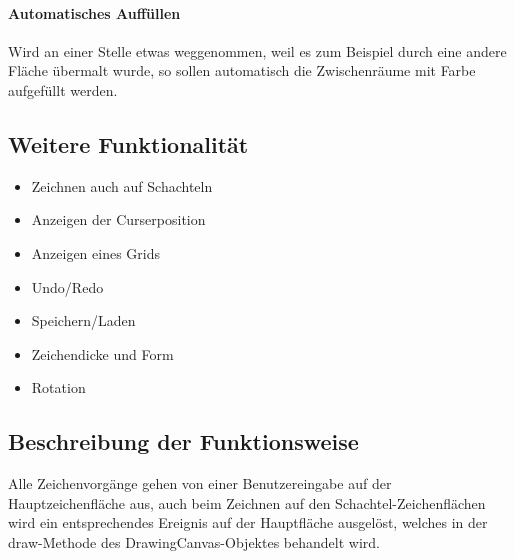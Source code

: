 \paragraph{Automatisches Auffüllen}
Wird an einer Stelle etwas weggenommen, weil es zum Beispiel durch eine andere Fläche übermalt wurde, so sollen automatisch die Zwischenräume mit Farbe aufgefüllt werden.

\subsection{Weitere Funktionalität}
\label{subsec:weiteres}

\begin{itemize}
  \item Zeichnen auch auf Schachteln
  \item Anzeigen der Curserposition
  \item Anzeigen eines Grids
  \item Undo/Redo
  \item Speichern/Laden
  \item Zeichendicke und Form
  \item Rotation
\end{itemize}

\subsection{Beschreibung der Funktionsweise}
\label{subsec:funktionsweise}

Alle Zeichenvorgänge gehen von einer Benutzereingabe auf der Hauptzeichenfläche aus, auch beim Zeichnen auf den Schachtel-Zeichenflächen wird ein entsprechendes Ereignis auf der Hauptfläche ausgelöst, welches in der draw-Methode des DrawingCanvas-Objektes behandelt wird.\\

